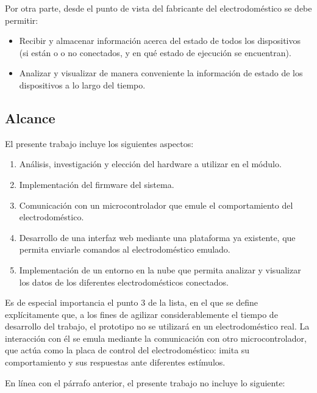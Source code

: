 Por otra parte, desde el punto de vista del fabricante del electrodoméstico se debe permitir:
\begin{itemize}
	\item Recibir y almacenar información acerca del estado de todos los dispositivos (si están o o no conectados, y en qué estado de ejecución se encuentran).
	\item Analizar y visualizar de manera conveniente la información de estado de los dispositivos a lo largo del tiempo.
\end{itemize}

\subsection{Alcance}

El presente trabajo incluye los siguientes aspectos:

\begin{enumerate}
	\item Análisis, investigación y elección del hardware a utilizar en el módulo.
	\item Implementación del firmware del sistema.
	\item Comunicación con un microcontrolador que emule el comportamiento del electrodoméstico.
	\item Desarrollo de una interfaz web mediante una plataforma ya existente, que permita enviarle comandos al electrodoméstico emulado.
	\item Implementación de un entorno en la nube que permita analizar y visualizar los datos de los diferentes electrodomésticos conectados.
\end{enumerate}

Es de especial importancia el punto 3 de la lista, en el que se define explícitamente que, a los fines de agilizar considerablemente el tiempo de desarrollo del trabajo, el prototipo no se utilizará en un electrodoméstico real. La interacción con él se emula mediante la comunicación con otro microcontrolador, que actúa como la placa de control del electrodoméstico: imita su comportamiento y sus respuestas ante diferentes estímulos.

En línea con el párrafo anterior, el presente trabajo no incluye lo siguiente:

